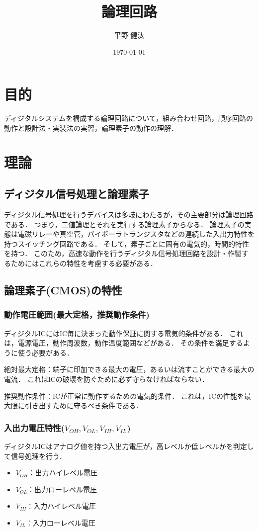 \documentclass{ltjsarticle}
\begin{document}
\title{論理回路}
\author{平野 健汰}
\date{\today}

\maketitle

\section{目的}
ディジタルシステムを構成する論理回路について，組み合わせ回路，順序回路の動作と設計法・実装法の実習，論理素子の動作の理解．

\section{理論}
\subsection{ディジタル信号処理と論理素子}
ディジタル信号処理を行うデバイスは多岐にわたるが，その主要部分は論理回路である．
つまり，二値論理とそれを実行する論理素子からなる．
論理素子の実態は電磁リレーや真空管，バイポーラトランジスタなどの連続した入出力特性を持つスイッチング回路である．
そして，素子ごとに固有の電気的，時間的特性を持つ．
このため，高速な動作を行うディジタル信号処理回路を設計・作製するためにはこれらの特性を考慮する必要がある．

\subsection{論理素子(CMOS)の特性}
\subsubsection{動作電圧範囲(最大定格，推奨動作条件)}
ディジタルICにはIC毎に決まった動作保証に関する電気的条件がある．
これは，電源電圧，動作周波数，動作温度範囲などがある．
その条件を満足するように使う必要がある．

\noindent 絶対最大定格：端子に印加できる最大の電圧，あるいは流すことができる最大の電流．
これはICの破壊を防ぐために必ず守らなければならない．

\noindent 推奨動作条件：ICが正常に動作するための電気的条件．
これは，ICの性能を最大限に引き出すために守るべき条件である．

\subsubsection{入出力電圧特性(${V_{OH}, V_{OL}, V_{IH}, V_{IL}}$)}
ディジタルICはアナログ値を持つ入出力電圧が，高レベルか低レベルかを判定して信号処理を行う．
\begin{itemize}
  \item ${V_{OH}}$：出力ハイレベル電圧
  \item ${V_{OL}}$：出力ローレベル電圧
  \item ${V_{IH}}$：入力ハイレベル電圧
  \item ${V_{IL}}$：入力ローレベル電圧
\end{itemize}
\end{document}
